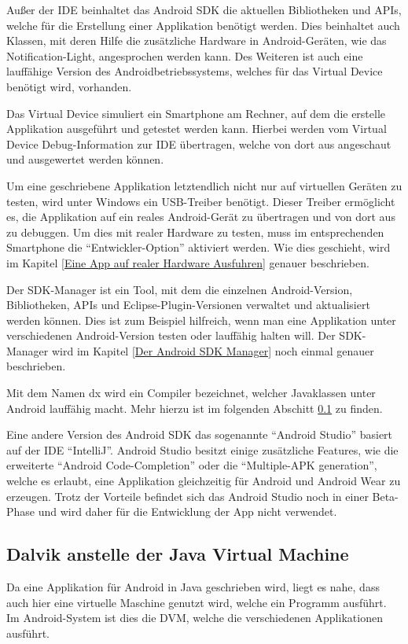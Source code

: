 Au\ss{}er der \ac{IDE} beinhaltet das Android \ac{SDK} die aktuellen Bibliotheken und APIs, welche f\"ur die Erstellung einer Applikation ben\"otigt werden. Dies beinhaltet auch Klassen, mit deren Hilfe die zus\"atzliche Hardware in Android-Ger\"aten, wie das Notification-Light, angesprochen werden kann. Des Weiteren ist auch eine lauff\"ahige Version des Androidbetriebssystems, welches f\"ur das Virtual Device ben\"otigt wird, vorhanden.

Das Virtual Device simuliert ein Smartphone am Rechner, auf dem die erstelle Applikation ausgef\"uhrt und getestet werden kann. Hierbei werden vom Virtual Device Debug-Information zur \ac{IDE} \"ubertragen, welche von dort aus angeschaut und ausgewertet werden k\"onnen.

Um eine geschriebene Applikation letztendlich nicht nur auf virtuellen Ger\"aten zu testen, wird unter Windows ein USB-Treiber ben\"otigt. Dieser Treiber erm\"oglicht es, die Applikation auf ein reales Android-Ger\"at zu \"ubertragen und von dort aus zu debuggen.
Um dies mit realer Hardware zu testen, muss im entsprechenden Smartphone die "`Entwickler-Option"' aktiviert werden. Wie dies geschieht, wird im Kapitel \ref{Eine App auf realer Hardware Ausfuhren} genauer beschrieben.

Der SDK-Manager ist ein Tool, mit dem die einzelnen Android-Version, Bibliotheken, APIs und Eclipse-Plugin-Versionen verwaltet und aktualisiert werden k\"onnen. Dies ist zum Beispiel hilfreich, wenn man eine Applikation unter verschiedenen Android-Version testen oder lauff\"ahig halten will. Der SDK-Manager wird im Kapitel \ref{Der Android SDK Manager} noch einmal genauer beschrieben.

Mit dem Namen dx wird ein Compiler bezeichnet, welcher Javaklassen unter Android lauff\"ahig macht. Mehr hierzu ist im folgenden Abschitt \ref{Dalvik anstelle der Java Virtual Machine} zu finden.

Eine andere Version des Android \ac{SDK} das sogenannte "`Android Studio"' basiert auf der \ac{IDE} "`IntelliJ"'. Android Studio besitzt einige zus\"atzliche Features, wie die erweiterte "`Android Code-Completion"' oder die "`Multiple-APK generation"', welche es erlaubt, eine Applikation gleichzeitig f\"ur Android und Android Wear zu erzeugen. Trotz der Vorteile befindet sich das Android Studio noch in einer Beta-Phase und wird daher f\"ur die Entwicklung der App nicht verwendet. \cite{DevAndroidStudio}

\subsection{Dalvik anstelle der Java Virtual Machine} \label{Dalvik anstelle der Java Virtual Machine}
Da eine Applikation f\"ur Android in Java geschrieben wird, liegt es nahe, dass auch hier eine virtuelle Maschine genutzt wird, welche ein Programm ausf\"uhrt. Im Android-System ist dies die \ac{DVM}, welche die verschiedenen Applikationen ausf\"uhrt. \cite{Android44}

